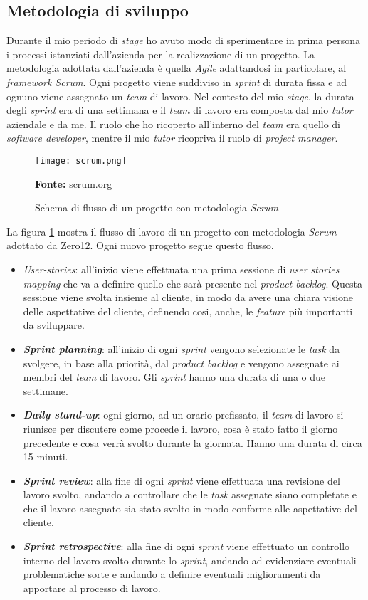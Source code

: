 \subsection{Metodologia di sviluppo}
Durante il mio periodo di \textit{stage} ho avuto modo di sperimentare in prima persona i processi istanziati dall'azienda per la realizzazione di un progetto.
La metodologia adottata dall'azienda è quella \textit{Agile} adattandosi in particolare, al \textit{framework Scrum}.
Ogni progetto viene suddiviso in \textit{sprint} di durata fissa e ad ognuno viene assegnato un \textit{team} di lavoro.
Nel contesto del mio \textit{stage}, la durata degli \textit{sprint} era di una settimana e il \textit{team} di lavoro era composta dal mio \textit{tutor} aziendale e da me.
Il ruolo che ho ricoperto all'interno del \textit{team} era quello di \textit{software developer}, mentre il mio \textit{tutor} ricopriva il ruolo di \textit{project manager}.
\begin{figure}[H]
    \centering
    \texttt{[image: scrum.png]}
    \caption{Schema di flusso di un progetto con metodologia \textit{Scrum}}
    \small \textbf{Fonte:} \url{scrum.org}
    \label{fig:scrum}
\end{figure}
\noindent
La figura \ref{fig:scrum} mostra il flusso di lavoro di un progetto con metodologia \textit{Scrum} adottato da Zero12. Ogni nuovo progetto segue questo flusso. 
\begin{itemize}
    \item \textit{\gls{User-stories}}: all'inizio viene effettuata una prima sessione di \textit{user stories mapping} che va a definire quello che sarà presente nel \textit{product backlog}. Questa sessione viene svolta insieme al cliente, in modo da avere una chiara visione delle aspettative del cliente, definendo cosi, anche, le \textit{feature} più importanti da sviluppare.
    \item \textbf{\textit{Sprint planning}}: all'inizio di ogni \textit{sprint} vengono selezionate le \textit{task} da svolgere, in base alla priorità, dal \textit{product backlog} e vengono assegnate ai membri del \textit{team} di lavoro. Gli \textit{sprint} hanno una durata di una o due settimane.
    \item \textbf{\textit{Daily stand-up}}: ogni giorno, ad un orario prefissato, il \textit{team} di lavoro si riunisce per discutere come procede il lavoro, cosa è stato fatto il giorno precedente e cosa verrà svolto durante la giornata. Hanno una durata di circa 15 minuti.
    \item \textbf{\textit{Sprint review}}: alla fine di ogni \textit{sprint} viene effettuata una revisione del lavoro svolto, andando a controllare che le \textit{task} assegnate siano completate e che il lavoro assegnato sia stato svolto in modo conforme alle aspettative del cliente.
    \item \textbf{\textit{Sprint retrospective}}: alla fine di ogni \textit{sprint} viene effettuato un controllo interno del lavoro svolto durante lo \textit{sprint}, andando ad evidenziare eventuali problematiche sorte e andando a definire eventuali miglioramenti da apportare al processo di lavoro.
\end{itemize}
